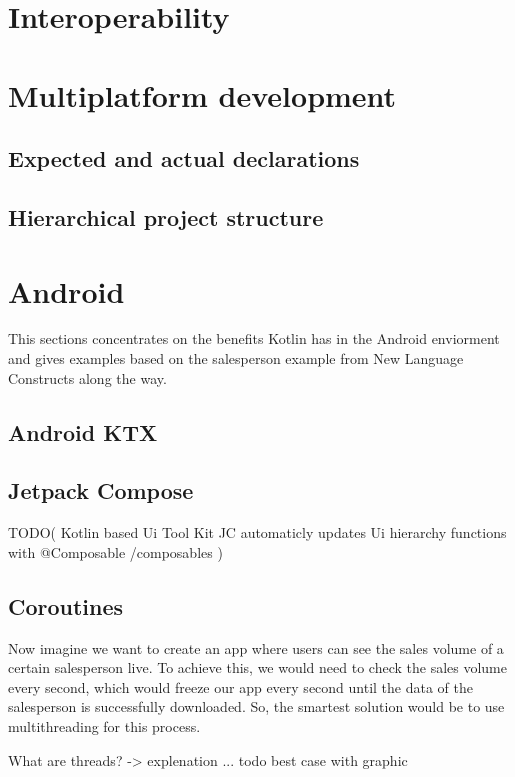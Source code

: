 \documentclass[a4paper, 11pt]{article}
\begin{document}
\section{Interoperability}

\section{Multiplatform development}
	\subsection{Expected and actual declarations﻿}
	\subsection{Hierarchical project structure﻿}
\section{Android}
	This sections concentrates on the benefits Kotlin has in the Android enviorment and gives examples based on the salesperson example from New Language Constructs along the way.
 \subsection{Android KTX}
 
 \subsection{Jetpack Compose}
TODO(
 Kotlin based Ui Tool Kit 
JC automaticly updates Ui hierarchy
functions with @Composable /composables
)
 \subsection{Coroutines}
Now imagine we want to create an app where users can see the sales volume of a certain salesperson live. To achieve this, we would need to check the sales volume every second, which would freeze our app every second until the data of the salesperson is successfully downloaded. So, the smartest solution would be to use multithreading for this process.

What are threads? -> explenation ... todo
best case with graphic
\end{document}
